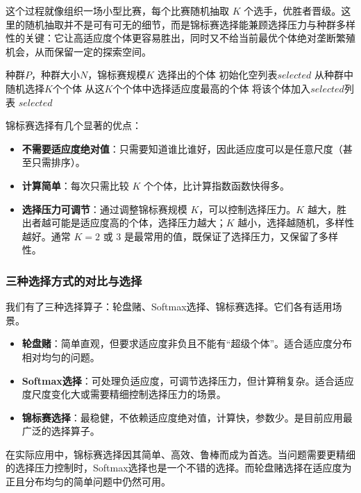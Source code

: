 \documentclass[lang=cn,zihao=-4,a4paper,fontset=windows]{beautybook}
\begin{document}
这个过程就像组织一场小型比赛，每个比赛随机抽取 \(K\) 个选手，优胜者晋级。这里的随机抽取并不是可有可无的细节，而是锦标赛选择能兼顾选择压力与种群多样性的关键：它让高适应度个体更容易胜出，同时又不给当前最优个体绝对垄断繁殖机会，从而保留一定的探索空间。

\begin{algorithm}[H]
\caption{锦标赛选择}
\begin{algorithmic}[1]
\REQUIRE 种群$P$，种群大小$N$，锦标赛规模$K$
\ENSURE 选择出的个体
\STATE 初始化空列表$selected$
    \STATE 从种群中随机选择$K$个个体
    \STATE 从这$K$个个体中选择适应度最高的个体
    \STATE 将该个体加入$selected$列表
\ENDWHILE
\RETURN $selected$
\end{algorithmic}
\end{algorithm}

锦标赛选择有几个显著的优点：
\begin{itemize}
    \item \textbf{不需要适应度绝对值}：只需要知道谁比谁好，因此适应度可以是任意尺度（甚至只需排序）。
    \item \textbf{计算简单}：每次只需比较 \(K\) 个个体，比计算指数函数快得多。
    \item \textbf{选择压力可调节}：通过调整锦标赛规模 \(K\)，可以控制选择压力。\(K\) 越大，胜出者越可能是适应度高的个体，选择压力越大；\(K\) 越小，选择越随机，多样性越好。通常 \(K=2\) 或 \(3\) 是最常用的值，既保证了选择压力，又保留了多样性。
\end{itemize}

\subsubsection{三种选择方式的对比与选择}

我们有了三种选择算子：轮盘赌、Softmax选择、锦标赛选择。它们各有适用场景。

\begin{itemize}
    \item \textbf{轮盘赌}：简单直观，但要求适应度非负且不能有“超级个体”。适合适应度分布相对均匀的问题。
    \item \textbf{Softmax选择}：可处理负适应度，可调节选择压力，但计算稍复杂。适合适应度尺度变化大或需要精细控制选择压力的场景。
    \item \textbf{锦标赛选择}：最稳健，不依赖适应度绝对值，计算快，参数少。是目前应用最广泛的选择算子。
\end{itemize}

在实际应用中，锦标赛选择因其简单、高效、鲁棒而成为首选。当问题需要更精细的选择压力控制时，Softmax选择也是一个不错的选择。而轮盘赌选择在适应度为正且分布均匀的简单问题中仍然可用。
\end{document}
